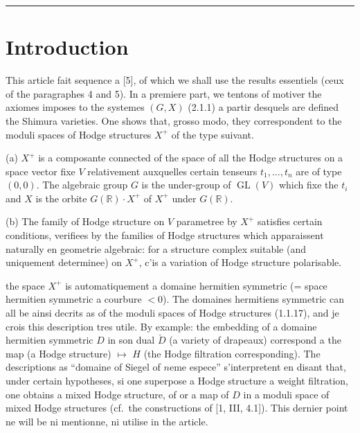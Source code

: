 \documentclass[12pt,a4paper]{article}
\theoremstyle{plain}
\theoremstyle{definition}
\theoremstyle{remark}
\DeclareMathOperator{\GL}{GL}
\newcommand{\RR}{\mathbb{R}}
\begin{document}
\vspace{1cm}
\noindent\rule{\textwidth}{0.4pt}

\setcounter{section}{0}

\section*{Introduction}

This article fait sequence a [5], of which we shall use the results essentiels (ceux of the paragraphes 4 and 5). In a premiere part, we tentons of motiver the axiomes imposes to the systemes $(G,X)$ (2.1.1) a partir desquels are defined the Shimura varieties. One shows that, grosso modo, they correspondent to the moduli spaces of Hodge structures $X^+$ of the type suivant.

(a) $X^+$ is a composante connected of the space of all the Hodge structures on a space vector fixe $V$ relativement auxquelles certain tenseurs $t_1,\dots,t_n$ are of type $(0,0)$. The algebraic group $G$ is the under-group of $\GL(V)$ which fixe the $t_i$ and $X$ is the orbite $G(\RR)\cdot X^+$ of $X^+$ under $G(\RR)$.

(b) The family of Hodge structure on $V$ parametree by $X^+$ satisfies certain conditions, verifiees by the families of Hodge structures which apparaissent naturally en geometrie algebraic: for a structure complex suitable (and uniquement determinee) on $X^+$, c'is a variation of Hodge structure polarisable.

the space $X^+$ is automatiquement a domaine hermitien symmetric (= space hermitien symmetric a courbure $< 0$). The domaines hermitiens symmetric can all be ainsi decrits as of the moduli spaces of Hodge structures (1.1.17), and je crois this description tres utile. By example: the embedding of a domaine hermitien symmetric $D$ in son dual $\check{D}$ (a variety of drapeaux) correspond a the map (a Hodge structure) $\mapsto$ $H$ (the Hodge filtration corresponding). The descriptions as ``domaine of Siegel of $n$eme espece'' s'interpretent en disant that, under certain hypotheses, si one superpose a Hodge structure a weight filtration, one obtains a mixed Hodge structure, of or a map of $D$ in a moduli space of mixed Hodge structures (cf.~the constructions of [1, III, 4.1]). This dernier point ne will be ni mentionne, ni utilise in the article.
\end{document}
